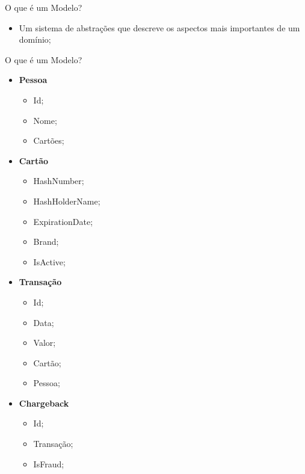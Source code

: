 \documentclass[aspectratio=169]{beamer}
\begin{document}
\begin{frame}{O que é um Modelo?}
	\begin{itemize}	
		\item Um sistema de abstrações que descreve os aspectos mais importantes de um domínio;
	\end{itemize}
\end{frame}

\begin{frame}{O que é um Modelo?}	
	\begin{multicols}{2}		
		\begin{itemize}	
			\item \textbf{Pessoa}
			\begin{itemize}	
				\item Id;
				\item Nome;
				\item Cartões;
			\end{itemize}
		\end{itemize}
		\begin{itemize}	
			\item \textbf{Cartão}
			\begin{itemize}	
				\item HashNumber;
				\item HashHolderName;
				\item ExpirationDate;
				\item Brand;
				\item IsActive;
			\end{itemize}
		\end{itemize}
		\begin{itemize}	
			\item \textbf{Transação}
			\begin{itemize}	
				\item Id;
				\item Data;
				\item Valor;
				\item Cartão;
				\item Pessoa;
			\end{itemize}
		\end{itemize}
		\begin{itemize}	
			\item \textbf{Chargeback}
			\begin{itemize}	
				\item Id;
				\item Transação;
				\item IsFraud;
			\end{itemize}
		\end{itemize}
	\end{multicols}
\end{frame}
\end{document}
